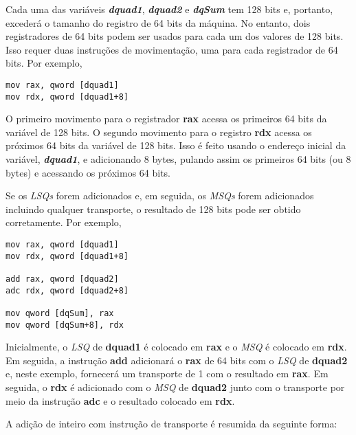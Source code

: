 Cada uma das variáveis \textbf{\textit{dquad1}}, \textbf{\textit{dquad2}} e \textbf{\textit{dqSum}} tem 128 bits e, portanto, excederá o tamanho do registro de 64 bits da máquina. No entanto, dois registradores de 64 bits podem ser usados para cada um dos valores de 128 bits. Isso requer duas instruções de movimentação, uma para cada registrador de 64 bits. Por exemplo,

\begin{lstlisting}
mov rax, qword [dquad1]
mov rdx, qword [dquad1+8]
\end{lstlisting}

O primeiro movimento para o registrador \textbf{rax} acessa os primeiros 64 bits da variável de 128 bits. O segundo movimento para o registro \textbf{rdx} acessa os próximos 64 bits da variável de 128 bits. Isso é feito usando o endereço inicial da variável, \textit{\textbf{dquad1}}, e adicionando 8 bytes, pulando assim os primeiros 64 bits (ou 8 bytes) e acessando os próximos 64 bits.

Se os \textit{LSQs} forem adicionados e, em seguida, os \textit{MSQs} forem adicionados incluindo qualquer transporte, o resultado de 128 bits pode ser obtido corretamente. Por exemplo,
\begin{lstlisting}
mov rax, qword [dquad1]
mov rdx, qword [dquad1+8]

add rax, qword [dquad2]
adc rdx, qword [dquad2+8]

mov qword [dqSum], rax
mov qword [dqSum+8], rdx
\end{lstlisting}


Inicialmente, o \textit{LSQ} de \textbf{dquad1} é colocado em \textbf{rax} e o \textit{MSQ} é colocado em \textbf{rdx}. Em seguida, a instrução \textbf{add} adicionará o \textbf{rax} de 64 bits com o \textit{LSQ} de \textbf{dquad2} e, neste exemplo, fornecerá um transporte de 1 com o resultado em \textbf{rax}. Em seguida, o \textbf{rdx} é adicionado com o \textit{MSQ} de \textbf{dquad2} junto com o transporte por meio da instrução \textbf{adc} e o resultado colocado em \textbf{rdx}.

A adição de inteiro com instrução de transporte é resumida da seguinte forma:

